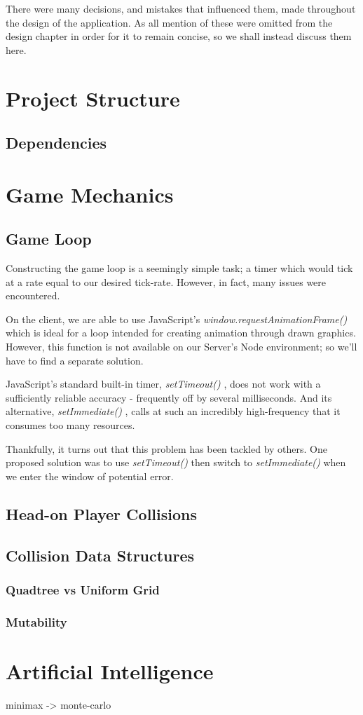 \documentclass{standalone}
\begin{document}
	There were many decisions, and mistakes that influenced them, made throughout the design of the application. As all mention of these were omitted from the design chapter  in order for it to remain concise, so we shall instead discuss them here.

	\section{Project Structure}
		\subsection{Dependencies}


	\section{Game Mechanics}
		\subsection{Game Loop}
			Constructing the game loop is a seemingly simple task; a timer which would tick at a rate equal to our desired tick-rate. However, in fact, many issues were encountered.

			On the client, we are able to use JavaScript's \emph{window.requestAnimationFrame()} \parencite{JsRequestAnimationFrame} which is ideal for a loop intended for creating animation through drawn graphics. However, this function is not available on our Server's Node environment; so we'll have to find a separate solution.

			JavaScript's standard built-in timer, \emph{setTimeout()} \parencite{JsSetTimeout}, does not work with a sufficiently reliable accuracy - frequently off by several milliseconds. And its alternative, \emph{setImmediate()} \parencite{JsSetImmediate}, calls at such an incredibly high-frequency that it consumes too many resources.

			Thankfully, it turns out that this problem has been tackled by others. One proposed solution \parencite{JsGameLoop} was to use \emph{setTimeout()} then switch to \emph{setImmediate()} when we enter the window of potential error.

		\subsection{Head-on Player Collisions}

		\subsection{Collision Data Structures}
			\subsubsection{Quadtree vs Uniform Grid}

			\subsubsection{Mutability}

	\section{Artificial Intelligence}
		minimax -> monte-carlo
\end{document}
